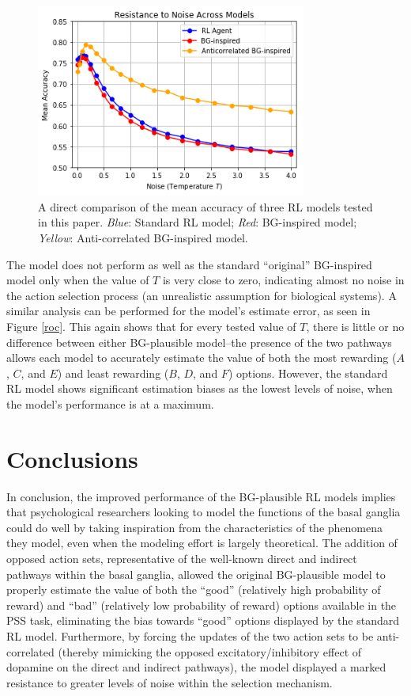 \documentclass[10pt,letterpaper]{article}
\begin{document}
\begin{figure}[ht]
	\begin{center}
		\includegraphics[width=3.5in]{resistance-to-noise.png}
	\end{center}
	\caption{A direct comparison of the mean accuracy of three RL models tested in this paper. \emph{Blue}: Standard RL model; \emph{Red}: BG-inspired model; \emph{Yellow}: Anti-correlated BG-inspired model.} 
	\label{resistance-to-noise}
\end{figure}

The model does not perform as well as the standard ``original'' BG-inspired model only when the value of $T$ is very close to zero, indicating almost no noise in the action selection process (an unrealistic assumption for biological systems). A similar analysis can be performed for the model's estimate error, as seen in Figure \ref{roc}. This again shows that for every tested value of $T$, there is little or no difference between either BG-plausible model--the presence of the two pathways allows each model to accurately estimate the value of both the most rewarding ($A$, $C$, and $E$) and least rewarding ($B$, $D$, and $F$) options. However, the standard RL model shows significant estimation biases as the lowest levels of noise, when the model's performance is at a maximum.

\section{Conclusions}

In conclusion, the improved performance of the BG-plausible RL models implies that psychological researchers looking to model the functions of the basal ganglia could do well by taking inspiration from the characteristics of the phenomena they model, even when the modeling effort is largely theoretical. The addition of opposed action sets, representative of the well-known direct and indirect pathways within the basal ganglia, allowed the original BG-plausible model to properly estimate the value of both the ``good'' (relatively high probability of reward) and ``bad'' (relatively low probability of reward) options available in the PSS task, eliminating the bias towards ``good'' options displayed by the standard RL model. Furthermore, by forcing the updates of the two action sets to be anti-correlated (thereby mimicking the opposed excitatory/inhibitory effect of dopamine on the direct and indirect pathways), the model displayed a marked resistance to greater levels of noise within the selection mechanism.    
\end{document}

